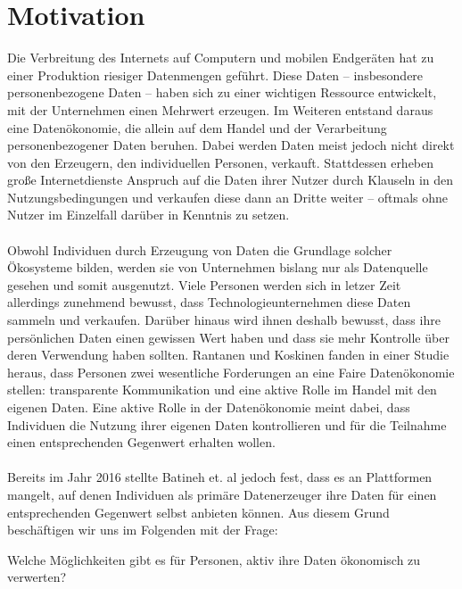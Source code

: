 \section{Motivation}

Die Verbreitung des Internets auf Computern und mobilen Endgeräten hat zu einer Produktion riesiger Datenmengen geführt. Diese Daten -- insbesondere personenbezogene Daten -- haben sich zu einer wichtigen Ressource entwickelt, mit der Unternehmen einen Mehrwert erzeugen. Im Weiteren entstand daraus eine Datenökonomie, die allein auf dem Handel und der Verarbeitung personenbezogener Daten beruhen. \cite{humanDemand_2020} Dabei werden Daten meist jedoch nicht direkt von den Erzeugern, den individuellen Personen, verkauft. Stattdessen erheben große Internetdienste Anspruch auf die Daten ihrer Nutzer durch Klauseln in den Nutzungsbedingungen und verkaufen diese dann an Dritte weiter -- oftmals ohne Nutzer im Einzelfall darüber in Kenntnis zu setzen. \cite{monetizingData_2016}
\\
\\
Obwohl Individuen durch Erzeugung von Daten die Grundlage solcher Ökosysteme bilden, werden sie von Unternehmen bislang nur als Datenquelle gesehen und somit ausgenutzt. Viele Personen werden sich in letzer Zeit allerdings zunehmend bewusst, dass Technologieunternehmen diese Daten sammeln und verkaufen. Darüber hinaus wird ihnen deshalb bewusst, dass ihre persönlichen Daten einen gewissen Wert haben und dass sie mehr Kontrolle über deren Verwendung haben sollten. Rantanen und Koskinen fanden in einer Studie heraus, dass Personen zwei wesentliche Forderungen an eine Faire Datenökonomie stellen: transparente Kommunikation und eine aktive Rolle im Handel mit den eigenen Daten. Eine aktive Rolle in der Datenökonomie meint dabei, dass Individuen die Nutzung ihrer eigenen Daten kontrollieren und für die Teilnahme einen entsprechenden Gegenwert erhalten wollen. \cite{humanDemand_2020}
\\
\\
Bereits im Jahr 2016 stellte Batineh et. al jedoch fest, dass es an Plattformen mangelt, auf denen Individuen als primäre Datenerzeuger ihre Daten für einen entsprechenden Gegenwert selbst anbieten können. \cite{monetizingData_2016} Aus diesem Grund beschäftigen wir uns im Folgenden mit der Frage:

\begin{center} 
Welche Möglichkeiten gibt es für Personen, aktiv ihre Daten ökonomisch zu verwerten? 
\end{center}